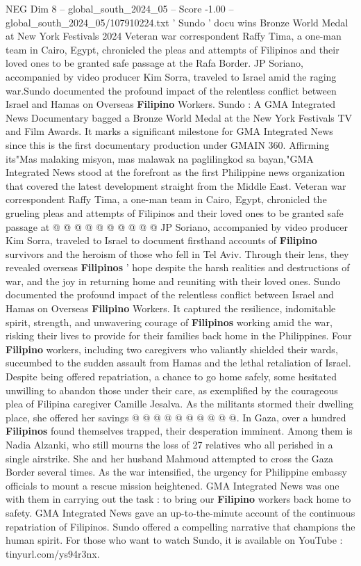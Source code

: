 \begin{textsample}{NEG Dim 8 – global\_south\_2024\_05 – Score -1.00 – global\_south\_2024\_05/107910224.txt}  \label{ex:f8_neg_099}
' Sundo ' docu wins Bronze World Medal at New York Festivals 2024 Veteran war correspondent Raffy Tima, a one-man team in Cairo, Egypt, chronicled the pleas and attempts of Filipinos and their loved ones to be granted safe passage at the Rafa Border.
JP Soriano, accompanied by video producer Kim Sorra, traveled to Israel amid the raging war.Sundo documented the profound impact of the relentless conflict between Israel and Hamas on Overseas \textbf{Filipino} Workers.
Sundo : A GMA Integrated News Documentary bagged a Bronze World Medal at the New York Festivals TV and Film Awards.
It marks a significant milestone for GMA Integrated News since this is the first documentary production under GMAIN 360.
Affirming its"Mas malaking misyon, mas malawak na paglilingkod sa bayan,"GMA Integrated News stood at the forefront as the first Philippine news organization that covered the latest development straight from the Middle East.
Veteran war correspondent Raffy Tima, a one-man team in Cairo, Egypt, chronicled the grueling pleas and attempts of Filipinos and their loved ones to be granted safe passage at @ @ @ @ @ @ @ @ @ @ JP Soriano, accompanied by video producer Kim Sorra, traveled to Israel to document firsthand accounts of \textbf{Filipino} survivors and the heroism of those who fell in Tel Aviv.
Through their lens, they revealed overseas \textbf{Filipinos} ' hope despite the harsh realities and destructions of war, and the joy in returning home and reuniting with their loved ones.
Sundo documented the profound impact of the relentless conflict between Israel and Hamas on Overseas \textbf{Filipino} Workers.
It captured the resilience, indomitable spirit, strength, and unwavering courage of \textbf{Filipinos} working amid the war, risking their lives to provide for their families back home in the Philippines.
Four \textbf{Filipino} workers, including two caregivers who valiantly shielded their wards, succumbed to the sudden assault from Hamas and the lethal retaliation of Israel.
Despite being offered repatriation, a chance to go home safely, some hesitated unwilling to abandon those under their care, as exemplified by the courageous plea of Filipina caregiver Camille Jesalva.
As the militants stormed their dwelling place, she offered her savings @ @ @ @ @ @ @ @ @ @.
In Gaza, over a hundred \textbf{Filipinos} found themselves trapped, their desperation imminent.
Among them is Nadia Alzanki, who still mourns the loss of 27 relatives who all perished in a single airstrike.
She and her husband Mahmoud attempted to cross the Gaza Border several times.
As the war intensified, the urgency for Philippine embassy officials to mount a rescue mission heightened.
GMA Integrated News was one with them in carrying out the task : to bring our \textbf{Filipino} workers back home to safety.
GMA Integrated News gave an up-to-the-minute account of the continuous repatriation of Filipinos.
Sundo offered a compelling narrative that champions the human spirit.
For those who want to watch Sundo, it is available on YouTube : tinyurl.com/ys94r3nx.

\end{textsample}

